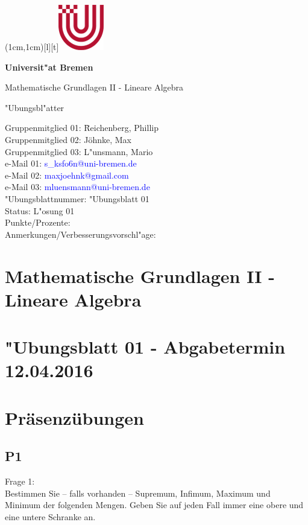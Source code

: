 \documentclass[12pt,a4paper]{article}
\newcommand\header{\textsf{\textbf{\Large \\}}}
\newcommand\headers{\textsf{\textbf{\Large \hspace{2.55cm} Universit"at Bremen}}}
\newcommand\headerf{\textsf{\large \hspace{2.6cm} Mathematische Grundlagen II - Lineare Algebra}}
\newcommand\headerg{\textsf{\large \hspace{2.6cm} "Ubungsbl"atter}}
\newcommand\FIG{\hspace{1.7cm}\includegraphics{Uni-Logo-new2.jpg}}
\begin{document}

\parpic(1cm,1cm)[l][t]{\FIG}
\header\par
\headers\par
\headerf\par
\headerg\par

\vspace{1.1cm}
\begin{flushleft}
\begin{tabbing}
Gruppenmitglied 01: \=Reichenberg, Phillip\\[2ex]
Gruppenmitglied 02: \>Jöhnke, Max\\[2ex]
Gruppenmitglied 03: \>L"unsmann, Mario\\[2ex]
e-Mail 01: \>\textcolor{blue}{s\_ksfo6n@uni-bremen.de}\\[2ex]
e-Mail 02: \>\textcolor{blue}{maxjoehnk@gmail.com}\\[2ex]
e-Mail 03: \>\textcolor{blue}{mluensmann@uni-bremen.de}\\[2ex]
"Ubungsblattnummer: \>"Ubungsblatt 01\\[2ex]
Status: \>L"osung 01\\[8ex]
Punkte/Prozente:\\[16ex]
Anmerkungen/Verbesserungsvorschl"age:
\end{tabbing}
\end{flushleft}

\clearpage

\section*{Mathematische Grundlagen II - Lineare Algebra}

\section*{"Ubungsblatt 01 - Abgabetermin 12.04.2016}

\section{Präsenzübungen}

\subsection{P1}

Frage 1:
\\[2ex]
Bestimmen Sie – falls vorhanden – Supremum, Infimum, Maximum und Minimum der folgenden Mengen. Geben Sie auf jeden Fall immer eine obere und eine untere Schranke an.
\end{document}
